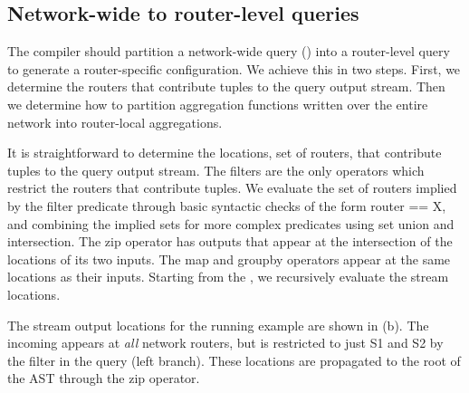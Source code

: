 \subsection{Network-wide to router-level queries}
\label{sec:network-to-router-local}


The compiler should partition a network-wide query () into a
router-level query to generate a router-specific configuration. We achieve this
in two steps. First, we determine the routers that contribute tuples to the
query output stream. Then we determine how to partition aggregation functions
written over the entire network into router-local aggregations.

 It is straightforward to determine
the locations, \ie set of routers, that contribute tuples to the query output
stream. The {\ct filter}s are the only operators which restrict the routers
that contribute tuples. We evaluate the set of routers implied by the {\ct
  filter} predicate through basic syntactic checks of the form {\ct router ==
  X}, and combining the implied sets for more complex predicates using set union
and intersection. The {\ct zip} operator has outputs that appear at the
intersection of the locations of its two inputs. The {\ct map} and {\ct groupby}
operators appear at the same locations as their inputs. Starting from the {\ct
  \pktlog}, we recursively evaluate the stream locations.

The stream output locations for the running example are shown in
(b). The incoming {\ct \pktlog} appears at {\em
  all} network routers, but is restricted to just {\ct S1} and {\ct S2} by the
filter in the query (left branch). These locations are propagated to the root of
the AST through the {\ct zip} operator.



